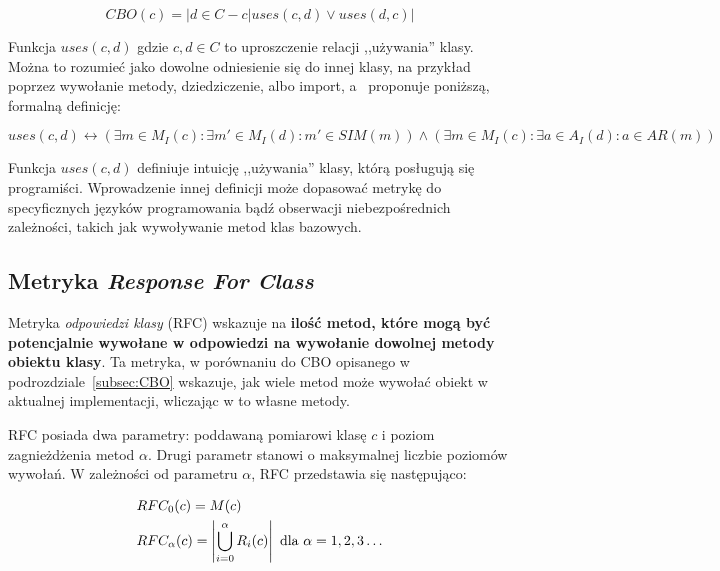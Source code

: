 \begin{equation*}
    CBO(c) = |{d \in C - {c} | uses(c, d) \vee uses(d, c)}|
\end{equation*}

Funkcja \(uses(c, d)\) gdzie \(c, d \in C\) to uproszczenie relacji ,,używania'' klasy.
Można to rozumieć jako dowolne odniesienie się do innej klasy, na przykład poprzez wywołanie metody, dziedziczenie,
albo import, a~\cite{briand1999unified} proponuje poniższą, formalną definicję:

\begin{equation*}
    uses(c, d) \leftrightarrow (\exists m \in M_{I}(c): \exists m' \in M_{I}(d): m' \in SIM(m))
    \wedge (\exists m \in M_{I}(c): \exists a \in A_{I}(d): a \in AR(m))
\end{equation*}

Funkcja \(uses(c, d)\) definiuje intuicję ,,używania'' klasy, którą posługują się programiści.
Wprowadzenie innej definicji może dopasować metrykę do specyficznych języków programowania bądź
obserwacji niebezpośrednich zależności, takich jak wywoływanie metod klas bazowych.

\subsection{Metryka \textit{Response For Class}}

Metryka \textit{odpowiedzi klasy} (\acrshort{RFC}) wskazuje na
\textbf{ilość metod, które mogą być potencjalnie wywołane w odpowiedzi na wywołanie dowolnej metody obiektu klasy}.
Ta metryka, w porównaniu do CBO opisanego w podrozdziale~\ref{subsec:CBO} wskazuje, jak wiele metod może wywołać
obiekt w aktualnej implementacji, wliczając w to własne metody.

RFC posiada dwa parametry: poddawaną pomiarowi klasę \(c\) i poziom zagnieżdżenia metod \(\alpha\).
Drugi parametr stanowi o maksymalnej liczbie poziomów wywołań.
W zależności od parametru \(\alpha\), RFC przedstawia się następująco:

\begin{equation*}
    \begin{aligned}
        &RFC_{0}(c) = M(c) \\
        &RFC_{\alpha}(c) = \left\lvert{\bigcup_{i=0}^{\alpha}R_{i}(c)}\right\rvert \text{ dla } \alpha = 1, 2, 3\mathellipsis \\
    \end{aligned}
\end{equation*}

